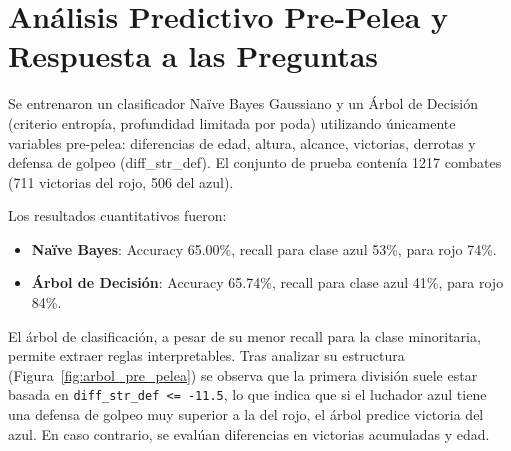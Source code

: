 \documentclass[11pt,a4paper]{article}
\begin{document}



\section{Análisis Predictivo Pre-Pelea y Respuesta a las Preguntas}

Se entrenaron un clasificador Naïve Bayes Gaussiano y un Árbol de Decisión (criterio entropía, profundidad limitada por poda) utilizando únicamente variables pre-pelea: diferencias de edad, altura, alcance, victorias, derrotas y defensa de golpeo (diff\_str\_def). El conjunto de prueba contenía 1217 combates (711 victorias del rojo, 506 del azul). 

Los resultados cuantitativos fueron:
\begin{itemize}
    \item \textbf{Naïve Bayes}: Accuracy 65.00\%, recall para clase azul 53\%, para rojo 74\%.
    \item \textbf{Árbol de Decisión}: Accuracy 65.74\%, recall para clase azul 41\%, para rojo 84\%.
\end{itemize}

El árbol de clasificación, a pesar de su menor recall para la clase minoritaria, permite extraer reglas interpretables. Tras analizar su estructura (Figura~\ref{fig:arbol_pre_pelea}) se observa que la primera división suele estar basada en \texttt{diff\_str\_def <= -11.5}, lo que indica que si el luchador azul tiene una defensa de golpeo muy superior a la del rojo, el árbol predice victoria del azul. En caso contrario, se evalúan diferencias en victorias acumuladas y edad. 
\end{document}
